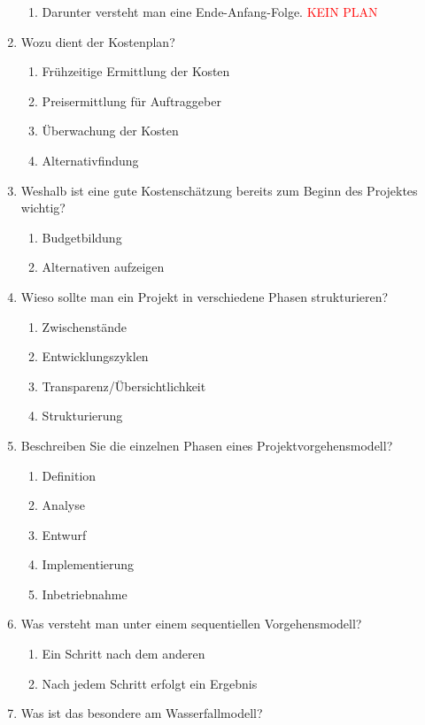 \documentclass[12pt,a4paper]{article}
\begin{document}
\begin{enumerate}
	\begin{enumerate}
		\item Darunter versteht man eine Ende-Anfang-Folge. \textcolor{red}{KEIN PLAN}
	\end{enumerate}
	\item Wozu dient der Kostenplan?
	\begin{enumerate}
		\item Frühzeitige Ermittlung der Kosten
		\item Preisermittlung für Auftraggeber
		\item Überwachung der Kosten
		\item Alternativfindung
	\end{enumerate}
	\item Weshalb ist eine gute Kostenschätzung bereits zum Beginn des Projektes wichtig?
	\begin{enumerate}
		\item Budgetbildung 
		\item Alternativen aufzeigen
	\end{enumerate}
	\item Wieso sollte man ein Projekt in verschiedene Phasen strukturieren?
	\begin{enumerate}
		\item Zwischenstände
		\item Entwicklungszyklen
		\item Transparenz/Übersichtlichkeit
		\item Strukturierung
	\end{enumerate}
	\item Beschreiben Sie die einzelnen Phasen eines Projektvorgehensmodell?
	\begin{enumerate}
		\item Definition
		\item Analyse
		\item Entwurf
		\item Implementierung
		\item Inbetriebnahme
	\end{enumerate}
	\item Was versteht man unter einem sequentiellen Vorgehensmodell?
	\begin{enumerate}
		\item Ein Schritt nach dem anderen
		\item Nach jedem Schritt erfolgt ein Ergebnis
	\end{enumerate}
	\item Was ist das besondere am Wasserfallmodell?

\end{enumerate}
\end{document}
